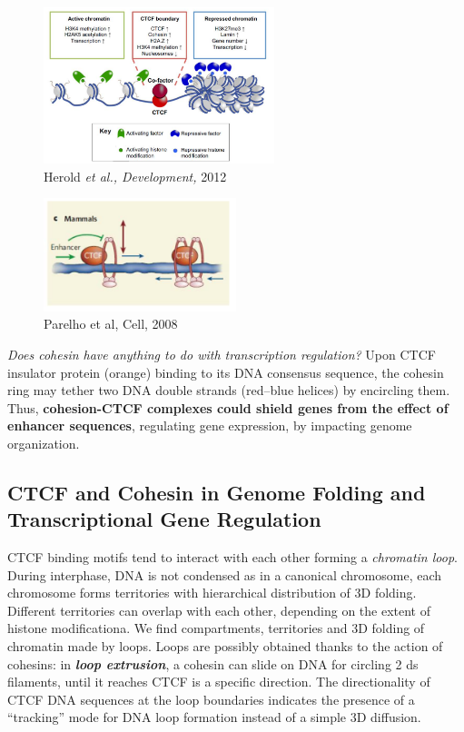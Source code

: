\begin{figure}
\centering
\includegraphics[width=0.6\textwidth]{../_resources/Screenshot_2022-10-14_at_12-11-11.png}
\caption{Herold \emph{et al., Development,} 2012}
\end{figure}


\begin{figure}
\centering
\includegraphics[width=0.5\textwidth]{../_resources/Screenshot_2022-10-14_at_12-10-46.png}
\caption{Parelho et al, Cell, 2008}
\end{figure}

\emph{Does cohesin have anything to do with transcription regulation?}
Upon CTCF insulator protein (orange) binding to its DNA consensus sequence, the cohesin ring may tether two DNA double strands (red--blue helices) by encircling them. Thus, \textbf{cohesion-CTCF complexes could shield genes from the effect of enhancer sequences}, regulating gene expression, by impacting genome organization.

\subsection{CTCF and Cohesin in Genome Folding and Transcriptional Gene Regulation}

CTCF binding motifs tend to interact with each other forming a \emph{chromatin loop}. During interphase, DNA is not condensed as in a canonical chromosome, each chromosome forms territories with hierarchical distribution of 3D folding. Different territories can overlap with each other, depending on the extent of histone modificationa. We find compartments, territories and 3D folding of chromatin made by loops. Loops are possibly obtained thanks to the action of cohesins: in \textbf{\emph{loop extrusion}}, a cohesin can slide on DNA for circling 2 ds filaments, until it reaches CTCF is a specific direction. The directionality of CTCF DNA sequences at the loop boundaries indicates the presence of a ``tracking'' mode for DNA loop formation instead of a simple 3D diffusion.

